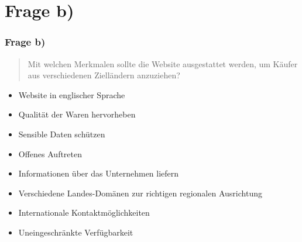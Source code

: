 \documentclass{beamer}
\begin{document}
\section{Frage b)}
\begin{frame}
\frametitle{Frage b)}

\begin{quote}
Mit welchen Merkmalen sollte die Website ausgestattet werden, um Käufer aus verschiedenen Zielländern anzuziehen?
\end{quote}

\begin{itemize}
\setlength{\itemsep}{6pt}
\item Website in englischer Sprache
\item Qualit\"at der Waren hervorheben
\item Sensible Daten sch\"utzen
\item Offenes Auftreten
\item Informationen \"uber das Unternehmen liefern
\item Verschiedene Landes-Dom\"anen  zur richtigen regionalen Ausrichtung
\item Internationale Kontaktm\"oglichkeiten
\item Uneingeschr\"ankte Verf\"ugbarkeit
\end{itemize}

\end{frame}
\end{document}

